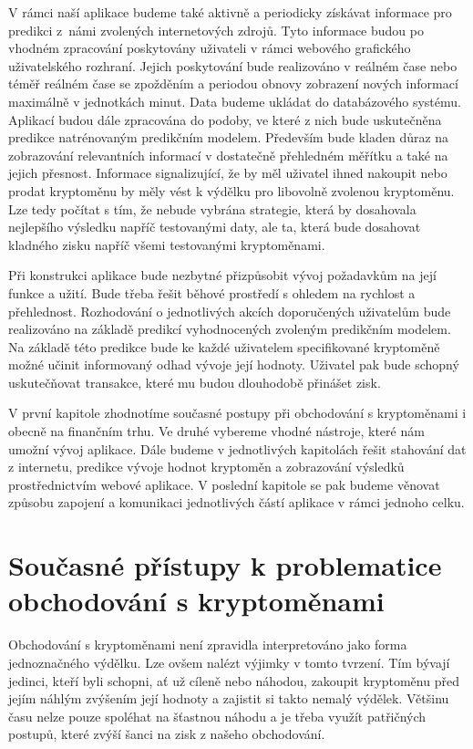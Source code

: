 V rámci naší aplikace budeme také aktivně a periodicky získávat informace pro predikci z~námi zvolených internetových zdrojů.
Tyto informace budou po vhodném zpracování poskytovány uživateli v rámci webového grafického uživatelského rozhraní.
Jejich poskytování bude realizováno v reálném čase nebo téměř reálném čase se zpožděním a periodou obnovy zobrazení nových informací maximálně v jednotkách minut. 
Data budeme ukládat do databázového systému. Aplikací budou dále zpracována do podoby, ve které z nich bude uskutečněna predikce natrénovaným predikčním modelem. 
Především bude kladen důraz na zobrazování relevantních informací v dostatečně přehledném měřítku a také na jejich přesnost. 
Informace signalizující, že by měl uživatel ihned nakoupit nebo prodat kryptoměnu by měly vést k výdělku pro libovolně zvolenou kryptoměnu.
Lze tedy počítat s tím, že nebude vybrána strategie, která by dosahovala nejlepšího výsledku napříč testovanými daty, ale ta, která bude dosahovat kladného zisku napříč všemi testovanými kryptoměnami.

Při konstrukci aplikace bude nezbytné přizpůsobit vývoj požadavkům na její funkce a užití.
Bude třeba řešit běhové prostředí s ohledem na rychlost a přehlednost.
Rozhodování o jednotlivých akcích doporučených uživatelům bude realizováno na základě predikcí vyhodnocených zvoleným predikčním modelem.
Na základě této predikce bude ke každé uživatelem specifikované kryptoměně možné učinit informovaný odhad vývoje její hodnoty. 
Uživatel pak bude schopný uskutečňovat transakce, které mu budou dlouhodobě přinášet zisk.

V první kapitole zhodnotíme současné postupy při obchodování s kryptoměnami i obecně na finančním trhu. Ve druhé vybereme vhodné nástroje, které nám umožní vývoj aplikace. Dále budeme v jednotlivých kapitolách řešit stahování dat z internetu, predikce vývoje hodnot kryptoměn a zobrazování výsledků prostřednictvím webové aplikace. V poslední kapitole se pak budeme věnovat způsobu zapojení a komunikaci jednotlivých částí aplikace v rámci jednoho celku.

\chapter{Současné přístupy k problematice obchodování s kryptoměnami}

Obchodování s kryptoměnami není zpravidla interpretováno jako forma jednoznačného výdělku. 
Lze ovšem nalézt výjimky v tomto tvrzení.
Tím bývají jedinci, kteří byli schopni, ať už cíleně nebo náhodou, zakoupit kryptoměnu před jejím náhlým zvýšením její hodnoty a zajistit si takto nemalý výdělek. 
Většinu času nelze pouze spoléhat na šťastnou náhodu a je třeba využít patřičných postupů, které zvýší šanci na zisk z našeho obchodování.

